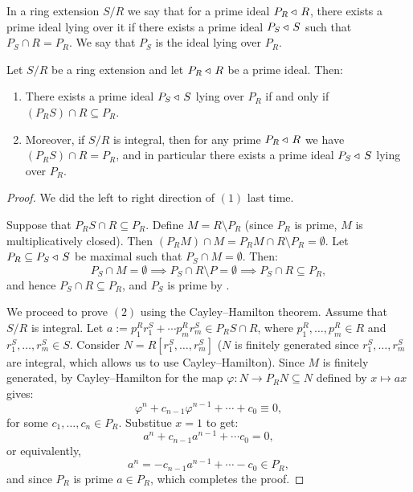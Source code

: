 \documentclass[11pt,a4paper]{article}
\begin{document}
\begin{remark}
  In a ring extension $S/R$ we say that for a prime ideal $P_R \triangleleft\, R$,
  there exists a prime ideal lying over it if there exists
  a prime ideal $P_S \triangleleft\, S$ such that $P_S \cap R = P_R$.
  We say that $P_S$ is the ideal lying over $P_R$.
\end{remark}

\begin{theorem}
  \label{thm:lying-over}
  Let $S/R$ be a ring extension and let $P_R \triangleleft\, R$ be a prime ideal.
  Then:
  \begin{enumerate}
    \item[(1)] There exists a prime ideal $P_S \triangleleft\, S$
      lying over $P_R$ if and only if $(P_R S) \cap R \subseteq P_R$.
    \item[(2)] Moreover, if $S/R$ is integral,
      then for any prime $P_R \triangleleft\, R$ we have $(P_R S) \cap R = P_R$,
      and in particular there exists a prime ideal $P_S \triangleleft\, S$
      lying over $P_R$.
  \end{enumerate}
\end{theorem}
\begin{proof}
  We did the left to right direction of $(1)$ last time.

  Suppose that $P_R S \cap R \subseteq P_R$.
  Define $M = R \setminus P_R$ (since $P_R$ is prime, $M$ is multiplicatively
  closed).
  Then $(P_R M) \cap M = P_R M \cap R \setminus P_R = \emptyset$.
  Let $P_R \subseteq P_S \triangleleft\, S$ be maximal such that
  $P_S \cap M = \emptyset$.
  Then:
  \[
    P_S \cap M = \emptyset \implies
    P_S \cap R \setminus P = \emptyset \implies
    P_S \cap R \subseteq P_R,
  \]
  and hence $P_S \cap R \subseteq P_R$,
  and $P_S$ is prime by .

  We proceed to prove $(2)$ using the Cayley--Hamilton theorem.
  Assume that $S/R$ is integral.
  Let $a := p_1^R r_1^S + \cdots p_m^R r_m^S \in P_R S \cap R$,
  where $p_1^R,\dots,p_m^R \in R$ and $r_1^S,\dots,r_m^S \in S$.
  Consider $N = R[r_1^S,\dots,r_m^S]$ ($N$ is finitely generated
  since $r_1^S,\dots,r_m^S$ are integral, which allows us to use
  Cayley--Hamilton).
  Since $M$ is finitely generated, by Cayley--Hamilton for the map
  $\varphi \colon N \to P_R N \subseteq N$ defined by $x \mapsto ax$
  gives:
  \[
    \varphi^n + c_{n-1} \varphi^{n-1} + \cdots + c_0 \equiv 0,
  \]
  for some $c_1,\dots,c_n \in P_R$.
  Substitue $x = 1$ to get:
  \[
    a^n + c_{n-1} a^{n-1} + \cdots c_0 = 0,
  \]
  or equivalently,
  \[
    a^n = -c_{n-1} a^{n-1} + \cdots -c_0 \in P_R,
  \]
  and since $P_R$ is prime $a \in P_R$, which completes the proof.
\end{proof}
\end{document}
